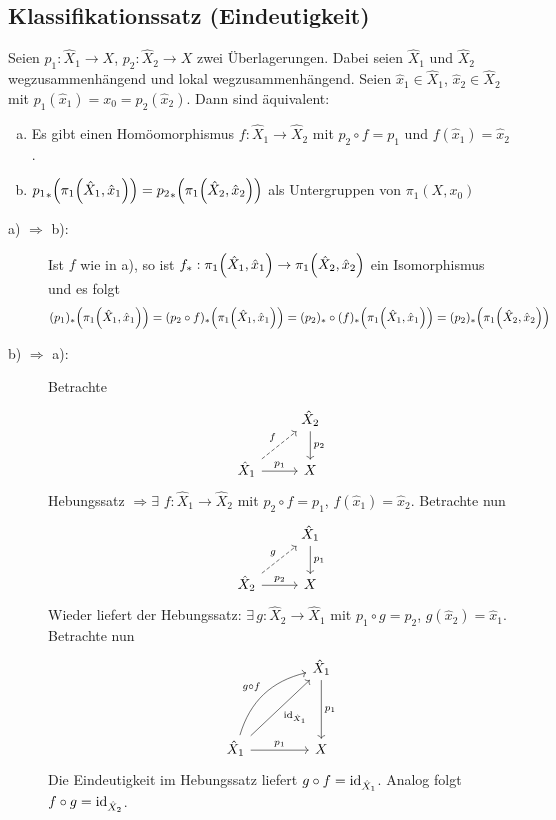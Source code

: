 \subsection{Klassifikationssatz (Eindeutigkeit)} %
\label{sub:132}
Seien $p_1 : \hat{X}_1 \to X$, $p_2 : \hat{X}_2 \to X$ zwei Überlagerungen. Dabei seien $\hat{X}_1$ und $\hat{X}_2$ wegzusammenhängend und lokal wegzusammenhängend.
Seien $\hat{x}_1 \in \hat{X}_1$, $\hat{x}_2 \in \hat{X}_2$ mit $p_1(\hat{x}_1) = x_0 = p_2(\hat{x}_2)$.
Dann sind äquivalent:
\begin{enumerate}[a)]
	\item Es gibt einen Homöomorphismus $f : \hat{X}_1 \to \hat{X}_2$ mit $p_2 \circ f = p_1$ und $f(\hat{x}_1) = \hat{x}_2$.
	\item ${p_1}_*\enbrace*{\pi_1 \enbrace*{\hat{X}_1, \hat{x}_1}} = {p_2}_* \enbrace*{\pi_1 \enbrace*{\hat{X}_2, \hat{x}_2}}$ als Untergruppen von $\pi_1(X,x_0)$
\end{enumerate}
\begin{description}
	\item[a) $\Rightarrow$ b):] Ist $f$ wie in a), so ist $f_* : \pi_1 \enbrace*{\hat{X}_1, \hat{x}_1} \to \pi_1 \enbrace*{\hat{X}_2, \hat{x}_2}$ ein Isomorphismus 
	 und es folgt 
	\[
		(p_1)_* \enbrace*{\pi_1 \enbrace*{\hat{X}_1, \hat{x}_1}} =  (p_2 \circ f)_* \enbrace*{\pi_1 \enbrace*{\hat{X}_1, \hat{x}_1}} 
		= (p_2)_* \circ (f)_* \enbrace*{\pi_1 \enbrace*{\hat{X}_1, \hat{x}_1}} = (p_2)_* \enbrace*{\pi_1 \enbrace*{\hat{X}_2, \hat{x}_2}}
	\]
	\item[b) $\Rightarrow$ a):] Betrachte
	\[
		\begin{tikzcd}
			\mbox{ } & \hat{X}_2 \dar{p_2}\\
			\hat{X}_1 \rar{p_1} \urar[dashed]{f}& X
		\end{tikzcd}
	\]
	Hebungssatz $\Rightarrow \exists$ $f : \hat{X}_1 \to \hat{X}_2$ mit $p_2 \circ f = p_1$, $f(\hat{x}_1) = \hat{x}_2$. Betrachte nun
	\[
		\begin{tikzcd}
			\mbox{} & \hat{X}_1\dar{p_1} \\
			\hat{X}_2 \rar{p_2} \urar[dashed]{g}&  X
		\end{tikzcd}
	\]
	Wieder liefert der Hebungssatz: $\exists \, g : \hat{X}_2 \to \hat{X}_1$ mit $p_1 \circ  g = p_2$, $g(\hat{x}_2) = \hat{x}_1$. Betrachte nun
	\[
		\begin{tikzcd}[column sep=4em, row sep=4em]
			\mbox{ } & \hat{X}_1 \dar{p_1}\\
			\hat{X}_1 \rar{p_1} \urar[swap]{\id_{\hat{X}_1}} \urar[bend left]{g \circ f} & X
		\end{tikzcd}
	\]
	Die Eindeutigkeit im Hebungssatz liefert $g \circ f = \operatorname{id}_{\hat{X}_1}$. Analog folgt $f \circ g = \operatorname{id}_{\hat{X}_2}$. \bewende
\end{description}

